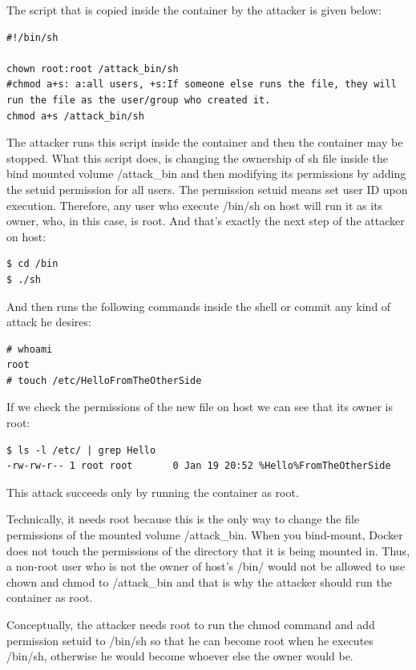 The script that is copied inside the container by the attacker is given below:
\begin{lstlisting}[style=shellscript, caption={2\_attack\_inside\_the\_container.sh}]
#!/bin/sh

chown root:root /attack_bin/sh
#chmod a+s: a:all users, +s:If someone else runs the file, they will run the file as the user/group who created it.
chmod a+s /attack_bin/sh
\end{lstlisting}

The attacker runs this script inside the container and then the container may be stopped. What this script does, is changing the ownership of sh file inside the bind mounted volume /attack\_bin and then modifying its permissions by adding the setuid permission for all users. The permission setuid means set user ID upon execution. Therefore, any user who execute /bin/sh on host will run it as its owner, who, in this case, is root. And that's exactly the next step of the attacker on host:

\begin{lstlisting}[style=terminal]
$ cd /bin
$ ./sh
\end{lstlisting}

And then runs the following commands inside the shell or commit any kind of attack he desires:
\begin{lstlisting}[style=terminal]
# whoami
root
# touch /etc/HelloFromTheOtherSide
\end{lstlisting}

If we check the permissions of the new file on host we can see that its owner is root:

\begin{lstlisting}[style=terminal]
$ ls -l /etc/ | grep Hello
-rw-rw-r-- 1 root root       0 Jan 19 20:52 %Hello%FromTheOtherSide
\end{lstlisting}

This attack succeeds only by running the container as root.

Technically, it needs root because this is the only way to change the file permissions of the mounted volume /attack\_bin. When you bind-mount, Docker does not touch the permissions of the directory that it is being mounted in. Thus, a non-root user who is not the owner of host's /bin/ would not be allowed to use chown and chmod to /attack\_bin and that is why the attacker should run the container as root.

Conceptually, the attacker needs root to run the chmod command and add permission setuid to /bin/sh so that he can become root when he executes /bin/sh, otherwise he would become whoever else the owner would be.

